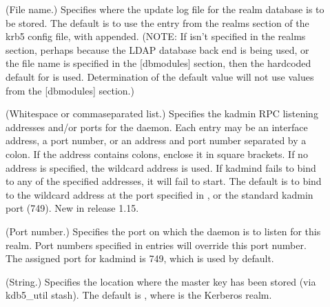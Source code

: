 \documentclass[letterpaper,10pt,english]{sphinxmanual}
\begin{document}
\begin{description}
\item[{}] \leavevmode
\sphinxAtStartPar
(File name.)  Specifies where the update log file for the realm
database is to be stored.  The default is to use the
 entry from the realms section of the krb5 config
file, with  appended.  (NOTE: If  isn’t
specified in the realms section, perhaps because the LDAP database
back end is being used, or the file name is specified in the
{[}dbmodules{]} section, then the hard\sphinxhyphen{}coded default for
 is used.  Determination of the 
default value will not use values from the {[}dbmodules{]} section.)

\item[{}] \leavevmode
\sphinxAtStartPar
(Whitespace\sphinxhyphen{} or comma\sphinxhyphen{}separated list.)  Specifies the kadmin RPC
listening addresses and/or ports for the {\hyperref[\detokenize{admin/admin_commands/kadmind:kadmind-8}]{}} daemon.
Each entry may be an interface address, a port number, or an
address and port number separated by a colon.  If the address
contains colons, enclose it in square brackets.  If no address is
specified, the wildcard address is used.  If kadmind fails to bind
to any of the specified addresses, it will fail to start.  The
default is to bind to the wildcard address at the port specified
in , or the standard kadmin port (749).  New in
release 1.15.

\item[{}] \leavevmode
\sphinxAtStartPar
(Port number.)  Specifies the port on which the {\hyperref[\detokenize{admin/admin_commands/kadmind:kadmind-8}]{}}
daemon is to listen for this realm.  Port numbers specified in
 entries will override this port number.  The
assigned port for kadmind is 749, which is used by default.

\item[{}] \leavevmode
\sphinxAtStartPar
(String.)  Specifies the location where the master key has been
stored (via kdb5\_util stash).  The default is {\hyperref[\detokenize{mitK5defaults:paths}]{}}, where  is the Kerberos realm.


\end{description}
\end{document}
